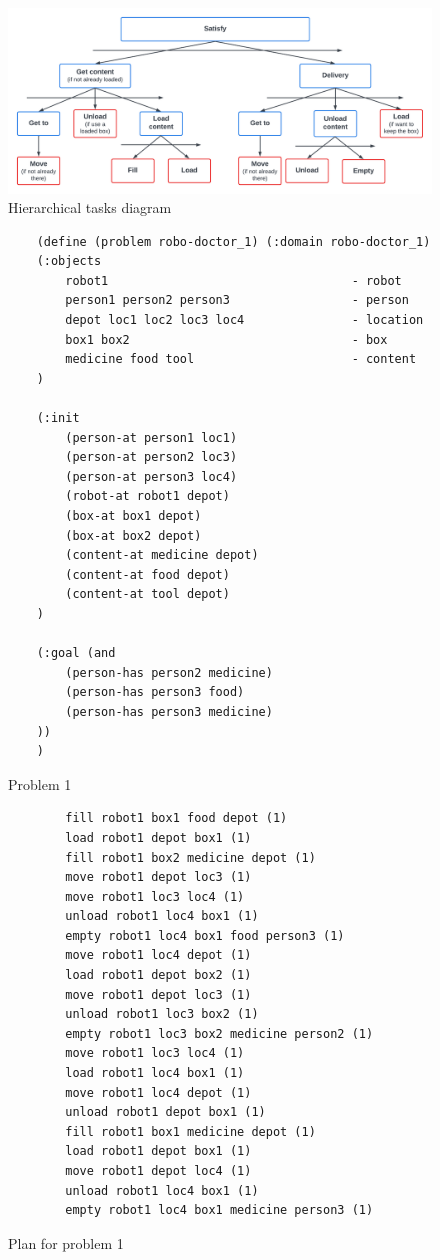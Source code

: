 \begin{figure}[h!]
    \includegraphics[scale = 0.66]{images/Actions_diagram.pdf}
    \caption{Hierarchical tasks diagram}
    \label{Actions diagram}
\end{figure}

\begin{figure}[h!]
    \begin{verbatim}
    (define (problem robo-doctor_1) (:domain robo-doctor_1)
    (:objects 
        robot1                                  - robot
        person1 person2 person3                 - person
        depot loc1 loc2 loc3 loc4               - location
        box1 box2                               - box
        medicine food tool                      - content
    )

    (:init
        (person-at person1 loc1)
        (person-at person2 loc3)
        (person-at person3 loc4)
        (robot-at robot1 depot)
        (box-at box1 depot)
        (box-at box2 depot)
        (content-at medicine depot)
        (content-at food depot)
        (content-at tool depot)
    )

    (:goal (and
        (person-has person2 medicine)
        (person-has person3 food)
        (person-has person3 medicine)
    ))
    )

    \end{verbatim}
    \caption{Problem 1}
    \label{problem1_problem}
\end{figure}

\begin{figure}[h!]
    \begin{verbatim}
        fill robot1 box1 food depot (1)
        load robot1 depot box1 (1)
        fill robot1 box2 medicine depot (1)
        move robot1 depot loc3 (1)
        move robot1 loc3 loc4 (1)
        unload robot1 loc4 box1 (1)
        empty robot1 loc4 box1 food person3 (1)
        move robot1 loc4 depot (1)
        load robot1 depot box2 (1)
        move robot1 depot loc3 (1)
        unload robot1 loc3 box2 (1)
        empty robot1 loc3 box2 medicine person2 (1)
        move robot1 loc3 loc4 (1)
        load robot1 loc4 box1 (1)
        move robot1 loc4 depot (1)
        unload robot1 depot box1 (1)
        fill robot1 box1 medicine depot (1)
        load robot1 depot box1 (1)
        move robot1 depot loc4 (1)
        unload robot1 loc4 box1 (1)
        empty robot1 loc4 box1 medicine person3 (1)
    \end{verbatim}
    \caption{Plan for problem 1}
    \label{problem1_plan}
\end{figure}

